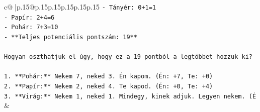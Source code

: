 \documentclass{article}
\begin{document}
{\begin{supertabular}{c@{$\;$}|p{.15\linewidth}@{}p{.15\linewidth}p{.15\linewidth}p{.15\linewidth}p{.15\linewidth}p{.15\linewidth}}
{{{\texttt{{-} Tányér: 0+1=1} \\
\texttt{{-} Papír: 2+4=6} \\
\texttt{{-} Pohár: 7+3=10} \\
\texttt{{-} **Teljes potenciális pontszám: 19**} \\
\\ 
\texttt{Hogyan oszthatjuk el úgy, hogy ez a 19 pontból a legtöbbet hozzuk ki?} \\
\\ 
\texttt{1. **Pohár:** Nekem 7, neked 3. Én kapom. (Én: +7, Te: +0)} \\
\texttt{2. **Papír:** Nekem 2, neked 4. Te kapod. (Én: +0, Te: +4)} \\
\texttt{3. **Virág:** Nekem 1, neked 1. Mindegy, kinek adjuk. Legyen nekem. (É} \\
            }
        }
    }
    & \\ \\


\end{supertabular}}
\end{document}
